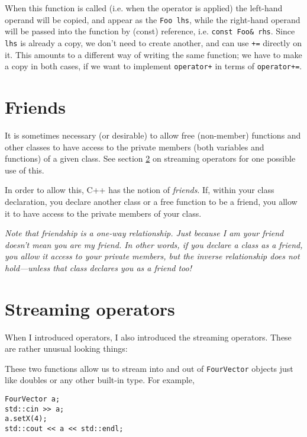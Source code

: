 \documentclass[a4paper]{scrartcl}
\begin{document}


When this function is called (i.e. when the operator is applied) the left-hand operand will be copied, and appear as the \verb|Foo lhs|, while the right-hand operand will be passed into the function by (const) reference, i.e. \verb|const Foo& rhs|. Since \verb|lhs| is already a copy, we don't need to create another, and can use \verb|+=| directly on it. This amounts to a different way of writing the same function; we have to make a copy in both cases, if we want to implement \verb|operator+| in terms of \verb|operator+=|.

\section{Friends}\label{sec:friend}
It is sometimes necessary (or desirable) to allow free (non-member) functions and other classes to have access to the private members (both variables and functions) of a given class. See section \ref{sec:streaming-operators} on streaming operators for one possible use of this.

In order to allow this, C++ has the notion of \emph{friends}. If, within your class declaration, you declare another class or a free function to be a friend, you allow it to have access to the private members of your class.

\emph{Note that friendship is a one-way relationship. Just because I am your friend doesn't mean you are my friend. In other words, if you declare a class as a friend, you allow it access to your private members, but the inverse relationship does not hold---unless that class declares you as a friend too!}

\section{Streaming operators}\label{sec:streaming-operators}
When I introduced operators, I also introduced the streaming operators. These are rather unusual looking things:



These two functions allow us to stream into and out of \verb|FourVector| objects just like doubles or any other built-in type. For example,

\begin{verbatim}
FourVector a;
std::cin >> a;
a.setX(4);
std::cout << a << std::endl;
\end{verbatim}
\end{document}
